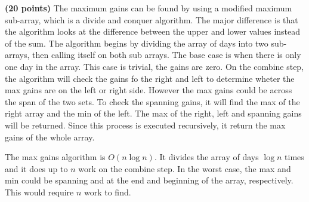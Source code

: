 \documentclass[11pt]{article}
\begin{document}
\begin{enumerate}
\begin{enumerate}
\end{enumerate}

\item %
 {\bf (20 points)}
 The maximum gains can be found by using a modified maximum sub-array, which is a divide and conquer algorithm. The major difference is that the algorithm looks at the difference between the upper and lower values instead of the sum. The algorithm begins by dividing the array of days into two sub-arrays, then calling itself on both sub arrays. The base case is when there is only one day in the array. This case is trivial, the gains are zero. On the combine step, the algorithm will check the gains fo the right and left to determine wheter the max gains are on the left or right side. However the max gains could be across the span of the two sets. To check the spanning gains, it will find the max of the right array and the min of the left. The max of the right, left and spanning gains will be returned. Since this process is executed recursively, it return the max gains of the whole array.

 The max gains algorithm is $O(n \log n)$. It divides the array of days $\log n$ times and it does up to $n$ work on the combine step. In the worst case, the max and min could be spanning and at the end and beginning of the array, respectively. This would require $n$ work to find.
\end{document}
